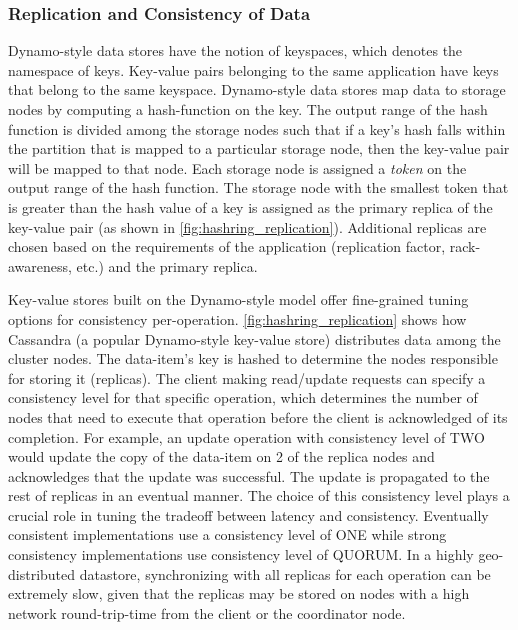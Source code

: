 \subsubsection{Replication and Consistency of Data}
\label{sec:replication}
Dynamo-style data stores have the notion of keyspaces, which denotes the namespace of keys. Key-value pairs belonging to the same application have keys that belong to the same keyspace. Dynamo-style data stores map data to storage nodes by computing a hash-function on the key. The output range of the hash function is divided among the storage nodes such that if a key's hash falls within the partition that is mapped to a particular storage node, then the key-value pair will be mapped to that node. Each storage node is assigned a \textit{token} on the output range of the hash function. The storage node with the smallest token that is greater than the hash value of a key is assigned as the primary replica of the key-value pair (as shown in \cref{fig:hashring_replication}). Additional replicas are chosen based on the requirements of the application (replication factor, rack-awareness, etc.) and the primary replica.
\par Key-value stores built on the Dynamo-style model offer fine-grained tuning options for consistency per-operation. \cref{fig:hashring_replication} shows how Cassandra (a popular Dynamo-style key-value store) distributes data among the cluster nodes. The data-item’s key is hashed to determine the nodes responsible for storing it (replicas). The client making read/update requests can specify a consistency level for that specific operation, which determines the number of nodes that need to execute that operation before the client is acknowledged of its completion. For example, an update operation with consistency level of TWO would update the copy of the data-item on 2 of the replica nodes and acknowledges that the update was successful. The update is propagated to the rest of replicas in an eventual manner. The choice of this consistency level plays a crucial role in tuning the tradeoff between latency and consistency. Eventually consistent implementations use a consistency level of ONE while strong consistency implementations use consistency level of QUORUM. In a highly geo-distributed datastore, synchronizing with all replicas for each operation can be extremely slow, given that the replicas may be stored on nodes with a high network round-trip-time from the client or the coordinator node.

